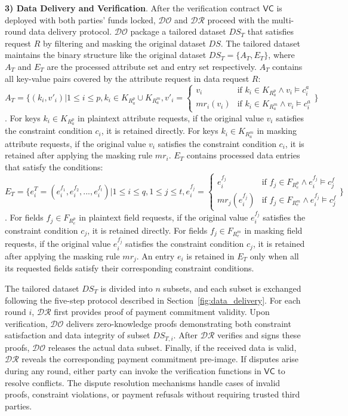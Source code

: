 \documentclass[journal]{IEEEtran}
\begin{document}
\textbf{3) Data Delivery and Verification}. 
After the verification contract $\mathsf{VC}$ is deployed with both parties' funds locked, $\mathcal{DO}$ and $\mathcal{DR}$ proceed with the multi-round data delivery protocol. $\mathcal{DO}$ package a tailored dataset $DS_T$ that satisfies request $R$ by filtering and masking the original dataset $DS$. The tailored dataset maintains the binary structure like the original dataset $DS_T = \{A_T, E_T\}$, where $A_T$ and $E_T$ are the processed attribute set and entry set respectively. $A_T$ contains all key-value pairs covered by the attribute request in data request $R$:
$A_T = \{(k_i, v'_i) | 1\leq i \leq p,k_i \in K_{R_a^p} \cup K_{R_a^{m}}, v'_i = \begin{cases} v_i & \text{if } k_i \in K_{R_a^p} \land v_i \models c_i^a \\ mr_i(v_i) & \text{if } k_i \in K_{R_a^m} \land v_i \models c_i^a\end{cases}\}$. For keys $k_i \in K_{R_a^p}$ in plaintext attribute requests, if the original value $v_i$ satisfies the constraint condition $c_i$, it is retained directly. For keys $k_i \in K_{R_a^m}$ in masking attribute requests, if the original value $v_i$ satisfies the constraint condition $c_i$, it is retained after applying the masking rule $mr_i$. $E_T$ contains processed data entries that satisfy the conditions: 
$E_T = \{e_i^T = (e_i^{f_1}, e_i^{f_2}, ..., e_i^{f_t}) |1 \leq i \leq q, 1 \leq j \leq t, e_i^{f_j} = \begin{cases}e_i^{f_j} & \text{if } f_j \in F_{R_e^p} \land e_i^{f_j} \models c_j^f \\mr_j(e_i^{f_j}) & \text{if } f_j \in F_{R_e^m} \land e_i^{f_j} \models c_j^f\end{cases}\}$. For fields $f_j \in F_{R_e^p}$ in plaintext field requests, if the original value $e_i^{f_j}$ satisfies the constraint condition $c_j$, it is retained directly. For fields $f_j \in F_{R_e^m}$ in masking field requests, if the original value $e_i^{f_j}$ satisfies the constraint condition $c_j$, it is retained after applying the masking rule $mr_j$. An entry $e_i$ is retained in $E_T$ only when all its requested fields satisfy their corresponding constraint conditions. 

The tailored dataset $DS_T$ is divided into $n$ subsets, and each subset is exchanged following the five-step protocol described in Section~\ref{fig:data_delivery}. For each round $i$, $\mathcal{DR}$ first provides proof of payment commitment validity. Upon verification, $\mathcal{DO}$ delivers zero-knowledge proofs demonstrating both constraint satisfaction and data integrity of subset $DS_{T,i}$. After $\mathcal{DR}$ verifies and signs these proofs, $\mathcal{DO}$ releases the actual data subset. Finally, if the received data is valid, $\mathcal{DR}$ reveals the corresponding payment commitment pre-image. If disputes arise during any round, either party can invoke the verification functions in $\mathsf{VC}$ to resolve conflicts. The dispute resolution mechanisms handle cases of invalid proofs, constraint violations, or payment refusals without requiring trusted third parties.
\end{document}

